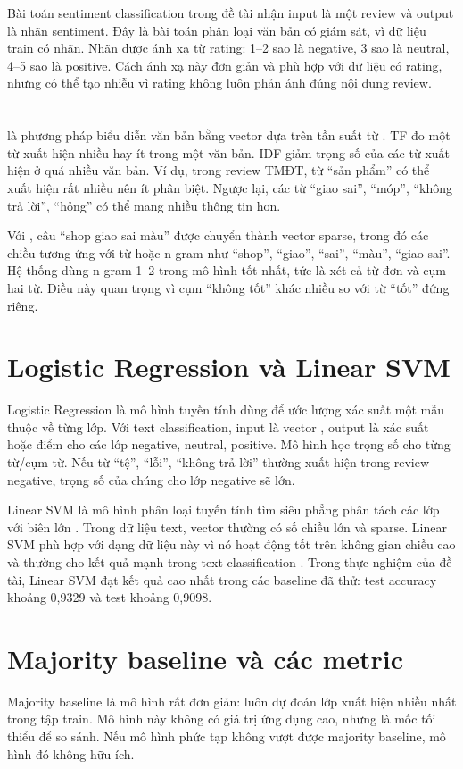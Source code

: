 Bài toán sentiment classification trong đề tài nhận input là một review và output là nhãn sentiment. Đây là bài toán phân loại văn bản có giám sát, vì dữ liệu train có nhãn. Nhãn được ánh xạ từ rating: 1--2 sao là negative, 3 sao là neutral, 4--5 sao là positive. Cách ánh xạ này đơn giản và phù hợp với dữ liệu có rating, nhưng có thể tạo nhiễu vì rating không luôn phản ánh đúng nội dung review.

\section{\TFIDF{}}
\TFIDF{} là phương pháp biểu diễn văn bản bằng vector dựa trên tần suất từ \cite{salton1988term}. TF đo một từ xuất hiện nhiều hay ít trong một văn bản. IDF giảm trọng số của các từ xuất hiện ở quá nhiều văn bản. Ví dụ, trong review TMĐT, từ “sản phẩm” có thể xuất hiện rất nhiều nên ít phân biệt. Ngược lại, các từ “giao sai”, “móp”, “không trả lời”, “hỏng” có thể mang nhiều thông tin hơn.

Với \TFIDF{}, câu “shop giao sai màu” được chuyển thành vector sparse, trong đó các chiều tương ứng với từ hoặc n-gram như “shop”, “giao”, “sai”, “màu”, “giao sai”. Hệ thống dùng n-gram 1--2 trong mô hình tốt nhất, tức là xét cả từ đơn và cụm hai từ. Điều này quan trọng vì cụm “không tốt” khác nhiều so với từ “tốt” đứng riêng.

\section{Logistic Regression và Linear SVM}
Logistic Regression là mô hình tuyến tính dùng để ước lượng xác suất một mẫu thuộc về từng lớp. Với text classification, input là vector \TFIDF{}, output là xác suất hoặc điểm cho các lớp negative, neutral, positive. Mô hình học trọng số cho từng từ/cụm từ. Nếu từ “tệ”, “lỗi”, “không trả lời” thường xuất hiện trong review negative, trọng số của chúng cho lớp negative sẽ lớn.

Linear SVM là mô hình phân loại tuyến tính tìm siêu phẳng phân tách các lớp với biên lớn \cite{cortes1995support}. Trong dữ liệu text, vector \TFIDF{} thường có số chiều lớn và sparse. Linear SVM phù hợp với dạng dữ liệu này vì nó hoạt động tốt trên không gian chiều cao và thường cho kết quả mạnh trong text classification \cite{fan2008liblinear}. Trong thực nghiệm của đề tài, Linear SVM đạt kết quả cao nhất trong các baseline đã thử: test accuracy khoảng 0,9329 và test \MacroFOne{} khoảng 0,9098.

\section{Majority baseline và các metric}
Majority baseline là mô hình rất đơn giản: luôn dự đoán lớp xuất hiện nhiều nhất trong tập train. Mô hình này không có giá trị ứng dụng cao, nhưng là mốc tối thiểu để so sánh. Nếu mô hình phức tạp không vượt được majority baseline, mô hình đó không hữu ích.

